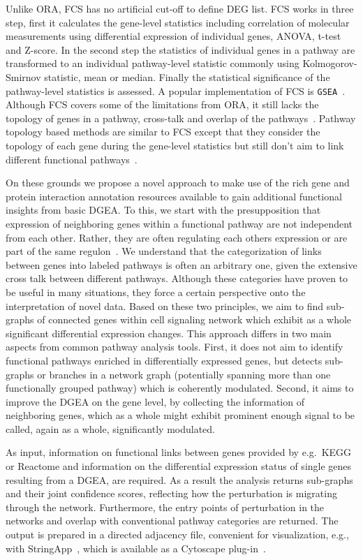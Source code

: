 \documentclass[10pt,a4paper,twocolumn]{article}
\begin{document}
Unlike ORA, FCS has no artificial cut-off to define DEG list. FCS works in
three step, first it calculates the gene-level statistics including
correlation of molecular measurements using differential expression of
individual genes, ANOVA, t-test and Z-score. In the second step the
statistics of individual genes in a pathway are transformed to an
individual pathway-level statistic commonly using Kolmogorov-Smirnov
statistic, mean or median. Finally the statistical significance of the
pathway-level statistics is assessed. A popular implementation of FCS is \texttt{GSEA}~\cite{subramanian2005gene}.
Although FCS covers some of the
limitations from ORA, it still lacks the topology of genes in a pathway,
cross-talk and overlap of the pathways~\cite{Khatri2012,Campos}. Pathway
topology based methods are similar to FCS except that they consider the
topology of each gene during the gene-level statistics but still don't aim
to link different functional pathways~\cite{Khatri2012}.

On these grounds we propose a novel approach to make use of the rich gene
and protein interaction annotation resources available to gain additional
functional insights from basic DGEA. To this, we start with the
presupposition that expression of neighboring genes within a functional
pathway are not independent from each other. Rather, they are often
regulating each others expression or are part of the same
regulon~\cite{Michalak}. We understand that the categorization of links
between genes into labeled pathways is often an arbitrary one, given the
extensive cross talk between different pathways. Although these categories
have proven to be useful in many situations, they force a certain
perspective onto the interpretation of novel data. Based on these two
principles, we aim to find sub-graphs of connected genes within cell
signaling network which exhibit as a whole significant differential
expression changes. This approach differs in two main aspects from common
pathway analysis tools. First, it does not aim to identify functional
pathways enriched in differentially expressed genes, but detects sub-graphs
or branches in a network graph (potentially spanning more than one
functionally grouped pathway) which is coherently modulated. Second, it
aims to improve the DGEA on the gene level, by collecting the information
of neighboring genes, which as a whole might exhibit prominent enough
signal to be called, again as a whole, significantly modulated.

As input, information on functional links between genes provided by
e.g.~KEGG or Reactome and information on the differential expression status
of single genes resulting from a DGEA, are required. As a result the
analysis returns sub-graphs and their joint confidence scores, reflecting
how the perturbation is migrating through the network. Furthermore, the
entry points of perturbation in the networks and overlap with conventional
pathway categories are returned. The output is prepared in a directed
adjacency file, convenient for visualization, e.g., with
StringApp~\cite{StringApp}, which is available as a Cytoscape plug-in~\cite{Cyto}.
\end{document}
